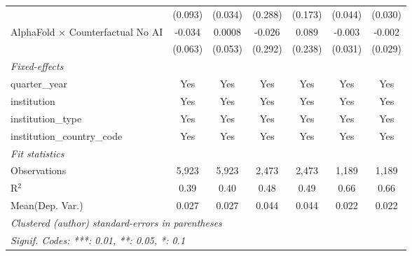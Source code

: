 \begin{tabular}{lcccccc}
                                            & (0.093)       & (0.034)       & (0.288)      & (0.173)       & (0.044) & (0.030)\\   
   AlphaFold $\times$ Counterfactual No AI  & -0.034        & 0.0008        & -0.026       & 0.089         & -0.003  & -0.002\\   
                                            & (0.063)       & (0.053)       & (0.292)      & (0.238)       & (0.031) & (0.029)\\   
   \midrule
   \emph{Fixed-effects}\\
   quarter\_year                            & Yes           & Yes           & Yes          & Yes           & Yes     & Yes\\  
   institution                              & Yes           & Yes           & Yes          & Yes           & Yes     & Yes\\  
   institution\_type                        & Yes           & Yes           & Yes          & Yes           & Yes     & Yes\\  
   institution\_country\_code               & Yes           & Yes           & Yes          & Yes           & Yes     & Yes\\  
   \midrule
   \emph{Fit statistics}\\
   Observations                             & 5,923         & 5,923         & 2,473        & 2,473         & 1,189   & 1,189\\  
   R$^2$                                    & 0.39          & 0.40          & 0.48         & 0.49          & 0.66    & 0.66\\  
Mean(Dep. Var.) & 0.027 & 0.027 & 0.044 & 0.044 & 0.022 & 0.022 \\
   \midrule \midrule
   \multicolumn{7}{l}{\emph{Clustered (author) standard-errors in parentheses}}\\
   \multicolumn{7}{l}{\emph{Signif. Codes: ***: 0.01, **: 0.05, *: 0.1}}\\
\end{tabular}
\par\endgroup
